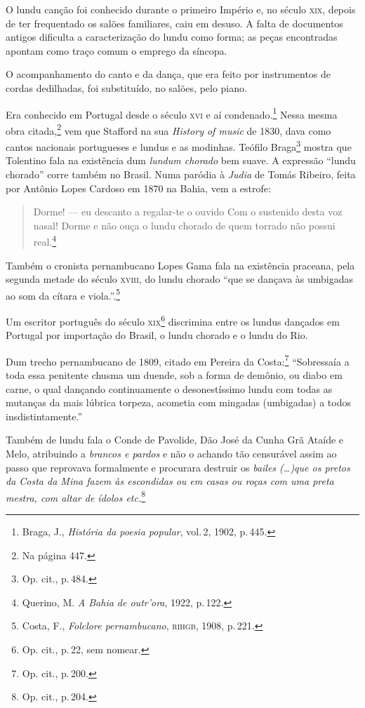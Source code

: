 O lundu canção foi conhecido durante o primeiro Império e, no século \textsc{xix},
depois de ter frequentado os salões familiares, caiu em desuso. A falta
de documentos antigos dificulta a caracterização do lundu como forma; as
peças encontradas apontam como traço comum o emprego da síncopa.

O acompanhamento do canto e da dança, que era feito por instrumentos de
cordas dedilhadas, foi substituído, no salões, pelo piano. %

Era conhecido em Portugal desde o século \textsc{xvi} e aí condenado.\footnote{Braga, J.,
\textit{História da poesia popular}, vol.\,2, 1902, p.\,445.} Nessa mesma obra
citada,\footnote{Na página 447.} vem que Stafford na sua \textit{History of music} de 1830,
dava como cantos nacionais portugueses e lundus e as modinhas. Teófilo
Braga\footnote{Op. cit., p.\,484.} mostra que Tolentino fala na existência dum
\textit{lundum chorado} bem suave. A expressão ``lundu chorado'' corre também
no Brasil. Numa paródia à \textit{Judia} de Tomás Ribeiro, feita por
Antônio Lopes Cardoso em 1870 na Bahia, vem a estrofe:

\begin{quote}
Dorme! --- eu descanto a regalar-te o ouvido
Com o sustenido desta voz nasal!
Dorme e não ouça o lundu chorado
de quem torrado não possui real.\footnote{Querino,
M. \textit{A Bahia de outr'ora}, 1922, p.\,122.} %
\end{quote}

Também o cronista pernambucano Lopes Gama fala na existência praceana,
pela segunda metade do século \textsc{xviii}, do lundu chorado ``que se dançava às
umbigadas ao som da cítara e viola.''.\footnote{Costa, F., \emph{Folclore pernambucano},
\textsc{rihgb}, 1908, p.\,221.}

Um escritor português do século \textsc{xix}\footnote{Op. cit., p.\,22, sem nomear.}
discrimina entre os lundus dançados em Portugal por importação do
Brasil, o lundu chorado e o lundu do Rio. %

Dum trecho pernambucano de 1809, citado em Pereira da Costa:\footnote{Op. cit.,
p.\,200.} ``Sobressaía a toda essa penitente chusma um duende, sob a
forma de demônio, ou diabo em carne, o qual dançando continuamente o
desonestíssimo lundu com todas as mutanças da mais lúbrica torpeza,
acometia com mingadas (umbigadas) a todos insdistintamente.''

Também de lundu fala o Conde de Pavolide, Dão José da Cunha Grã Ataíde e
Melo, atribuindo a \textit{brancos e pardos} e não o achando tão censurável
assim ao passo que reprovava formalmente e procurara destruir os
\textit{bailes (\ldots{})que os pretos da Costa da Mina fazem às escondidas ou em
casas ou roças com uma preta mestra, com altar de ídolos etc.}\footnote{Op. cit., p.\,204.} %

